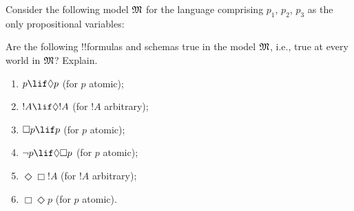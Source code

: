 \documentclass[../../../include/open-logic-section]{subfiles}
\begin{document}
\begin{prob}
  Consider the following model $\mModel{M}$ for the language
  comprising $p_1$, $p_2$, $p_3$ as the only propositional variables:
  \begin{center}
  \end{center}
  Are the following !!{formula}s and schemas true in the model $\mModel{M}$,
  i.e., true at every world in $\mModel{M}$? Explain.
  \begin{enumerate}
  \item $p\lif \Diamond p$ (for $p$ atomic);
  \item $!A\lif \Diamond !A$ (for $!A$ arbitrary);
  \item $\Box p \lif p$ (for $p$ atomic);
  \item $\lnot p \lif \Diamond \Box p$ (for $p$ atomic);
  \item $\Diamond \Box !A$ (for $!A$ arbitrary);
  \item $\Box \Diamond p$ (for $p$ atomic). 
  \end{enumerate}
\end{prob}
\end{document}
